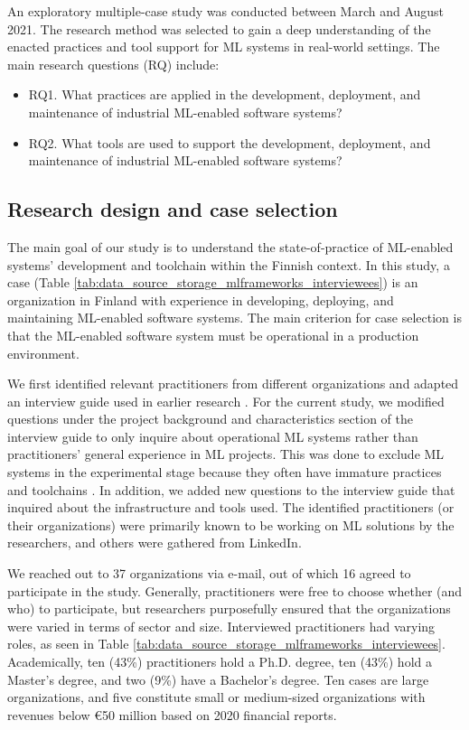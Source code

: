 
An exploratory multiple-case study \cite{Runeson2008} was conducted between March and August 2021. The research method was selected to gain a deep understanding of the enacted practices and tool support for ML systems in real-world settings. The main research questions (RQ) include:
\begin{itemize}
    \item RQ1. What practices are applied in the development, deployment, and maintenance of industrial ML-enabled software systems?
    \item RQ2. What tools are used to support the development, deployment, and maintenance of industrial ML-enabled software systems?
\end{itemize}

\subsection{Research design and case selection}
The main goal of our study is to understand the state-of-practice of ML-enabled systems' development and toolchain within the Finnish context. In this study, a case (Table  \ref{tab:data_source_storage_mlframeworks_interviewees}) is an organization in Finland with experience in developing, deploying, and maintaining ML-enabled software systems. The main criterion for case selection is that the ML-enabled software system must be operational in a production environment.

We first identified relevant practitioners from different organizations and adapted an interview guide used in earlier research \cite{Lwakatare2019}. For the current study, we modified questions under the project background and characteristics section of the interview guide to only inquire about operational ML systems rather than practitioners' general experience in ML projects. This was done to exclude ML systems in the experimental stage because they often have immature practices and toolchains \cite{Lwakatare2019}. In addition, we added new questions to the interview guide that inquired about the infrastructure and tools used. The identified practitioners (or their organizations) were primarily known to be working on ML solutions by the researchers, and others were gathered from LinkedIn.

We reached out to 37 organizations via e-mail, out of which 16 agreed to participate in the study. Generally, practitioners were free to choose whether (and who) to participate, but researchers purposefully ensured that the organizations were varied in terms of sector and size. Interviewed practitioners had varying roles, as seen in Table  \ref{tab:data_source_storage_mlframeworks_interviewees}. Academically, ten (43\%) practitioners hold a Ph.D. degree, ten (43\%) hold a Master's degree, and two (9\%) have a Bachelor's degree. Ten cases are large organizations, and five constitute small or medium-sized organizations with revenues below €50 million based on 2020 financial reports.


